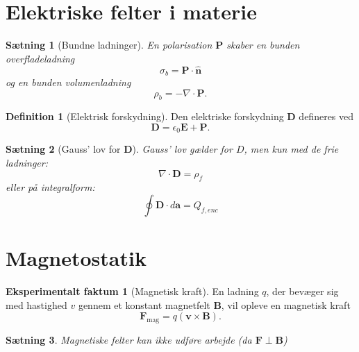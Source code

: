 \documentclass[]{article}
\newtheorem{theorem}{Sætning}
\theoremstyle{definition}
\newtheorem{definition}{Definition}
\newtheorem{experimental}{Eksperimentalt faktum}
\begin{document}
\section{Elektriske felter i materie}

\begin{theorem}[Bundne ladninger]
	En polarisation $\mathbf{P}$ skaber en bunden overfladeladning
	\begin{equation*}
		\sigma_b = \mathbf{P} \cdot \hat {\mathbf{n}} 
	\end{equation*}
	og en bunden volumenladning
	\begin{equation*}
		\rho_b = - \nabla \cdot \mathbf{P}.
	\end{equation*}
\end{theorem}

\begin{definition}[Elektrisk forskydning]
	Den elektriske forskydning $\mathbf{D}$ defineres ved
	\begin{equation*}
		\mathbf{D} = \epsilon_0 \mathbf{E}+\mathbf{P}.
	\end{equation*}
\end{definition}

\begin{theorem}[Gauss' lov for $\mathbf{D}$]
	Gauss' lov gælder for $D$, men kun med de frie ladninger:
	\begin{equation*}
		\nabla \cdot \mathbf{D} = \rho_f
	\end{equation*}
	eller på integralform:
	\begin{equation*}
		\oint \mathbf{D} \cdot d\mathbf{a} = Q_{f, enc}
	\end{equation*}
\end{theorem}

\section{Magnetostatik}
\begin{experimental}[Magnetisk kraft]
	En ladning $q$, der bevæger sig med hastighed $v$ gennem et konstant magnetfelt $\mathbf{B}$, vil opleve en magnetisk kraft
	\begin{equation*}
		\mathbf{F}_\text{mag} = q(\mathbf{v} \times \mathbf{B}).
	\end{equation*}
\end{experimental}
\begin{theorem}
	Magnetiske felter kan ikke udføre arbejde (da $\mathbf{F} \perp \mathbf{B}$)
\end{theorem}
\end{document}
